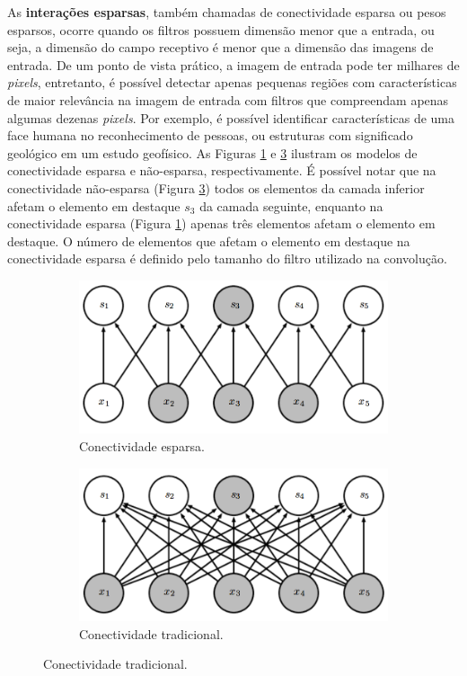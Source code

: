 As \textbf{interações esparsas}, também chamadas de conectividade esparsa ou pesos esparsos,
ocorre quando os filtros possuem dimensão menor que a entrada, ou seja, a
dimensão do campo receptivo é menor que a dimensão das imagens de entrada.
De um ponto de vista prático, a imagem de entrada pode ter milhares de \textit{pixels}, entretanto, é 
possível detectar apenas pequenas regiões com características de maior relevância na imagem de entrada
com filtros que compreendam apenas algumas dezenas \textit{pixels}.
Por exemplo, é possível identificar características de uma face humana no reconhecimento de pessoas, ou estruturas com
significado geológico em um estudo geofísico. As Figuras \ref{fig:sparse} e \ref{fig:full} ilustram
os modelos de conectividade esparsa e não-esparsa, respectivamente.
É possível notar que na conectividade não-esparsa (Figura \ref{fig:full}) todos os elementos da camada inferior
afetam o elemento em destaque $s_3$ da camada seguinte, enquanto na conectividade esparsa (Figura \ref{fig:sparse}) apenas
três elementos afetam o elemento em destaque. O número de elementos que afetam o elemento em destaque na
conectividade esparsa é definido pelo tamanho do filtro utilizado na convolução.
\begin{figure}[htp]
\begin{subfigure}{.5\textwidth}
  \centering
  \includegraphics[width=.9\linewidth]{fig/sparse}
  \caption{Conectividade esparsa.}
  \label{fig:sparse}
\end{subfigure}
\begin{subfigure}{.5\textwidth}
  \centering
  \includegraphics[width=.9\linewidth]{fig/full}
  \caption{Conectividade tradicional.}
  \label{fig:full}
\end{subfigure}%
\end{figure}

